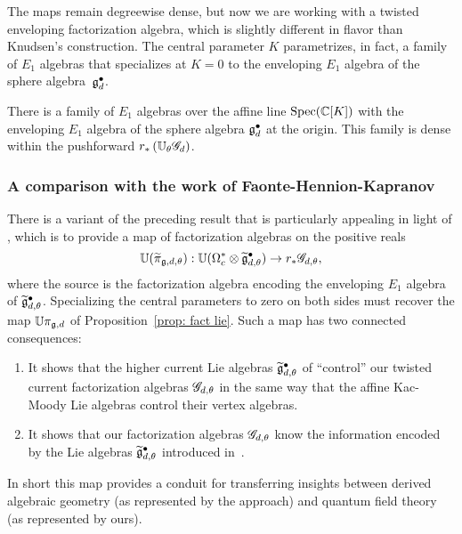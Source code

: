 The maps remain degreewise dense, but now we are working with a twisted enveloping factorization algebra,
which is slightly different in flavor than Knudsen's construction.
The central parameter $K$ parametrizes, in fact, a family of $E_1$ algebras that specializes at $K=0$ to the enveloping $E_1$ algebra of the sphere algebra~$\mathfrak g^\bullet_d$.

\begin{cor}
There is a family of $E_1$ algebras over the affine line ${\rm Spec}(\mathbb C[K])$ with the enveloping $E_1$ algebra of the sphere algebra $\mathfrak g^\bullet_d$ at the origin.
This family is dense within the pushforward $r_*\left(\mathbb U_\theta \mathscr G_d \right)$.
\end{cor}

\subsubsection{A comparison with the work of Faonte-Hennion-Kapranov}
\label{sec:FHK}

There is a variant of the preceding result that is particularly appealing in light of \cite{FHK},
which is to provide a map of factorization algebras on the positive reals
\[
\mathbb U(\widetilde{\pi}_{\mathfrak g,d,\theta}): \mathbb U(\Omega^*_c \otimes \widetilde{\mathfrak g}^\bullet_{d,\theta}) \to r_* \mathscr G_{d,\theta},
\] 
where the source is the factorization algebra encoding the enveloping $E_1$ algebra of $\widetilde{\mathfrak g}^\bullet_{d,\theta}$.
Specializing the central parameters to zero on both sides must recover the map $\mathbb U\pi_{\mathfrak g, d}$ of Proposition~\ref{prop: fact lie}.
Such a map has two connected consequences:
\begin{enumerate}
\item It shows that the higher current Lie algebras $\widetilde{\mathfrak g}^\bullet_{d,\theta}$ of \cite{FHK} ``control'' our twisted current factorization algebras $\mathscr G_{d,\theta}$ in the same way that the affine Kac-Moody Lie algebras control their vertex algebras.
\item It shows that our factorization algebras $\mathscr G_{d,\theta}$ know the information encoded by the Lie algebras $\widetilde{\mathfrak g}^\bullet_{d,\theta}$ introduced in~\cite{FHK}.
\end{enumerate}
In short this map provides a conduit for transferring insights between derived algebraic geometry (as represented by the \cite{FHK} approach) and quantum field theory (as represented by ours).


